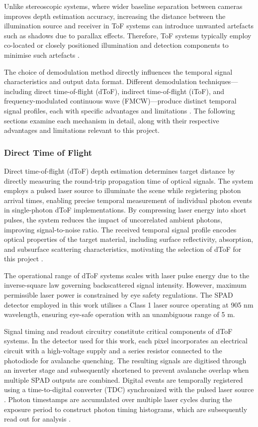 \documentclass[12pt,a4paper,oneside]{report}
\begin{document}
Unlike stereoscopic systems, where wider baseline separation between cameras improves depth estimation accuracy, increasing the distance between the illumination source and receiver in ToF systems can introduce unwanted artefacts such as shadows due to parallax effects. Therefore, ToF systems typically employ co-located or closely positioned illumination and detection components to minimise such artefacts \cite{bamji2022}.

The choice of demodulation method directly influences the temporal signal characteristics and output data format. Different demodulation techniques—including direct time-of-flight (dToF), indirect time-of-flight (iToF), and frequency-modulated continuous wave (FMCW)—produce distinct temporal signal profiles, each with specific advantages and limitations \cite{bamji2022}. The following sections examine each mechanism in detail, along with their respective advantages and limitations relevant to this project.

\subsubsection{Direct Time of Flight}
\label{subsubsec:direct_tof}

Direct time-of-flight (dToF) depth estimation determines target distance by directly measuring the round-trip propagation time of optical signals. The system employs a pulsed laser source to illuminate the scene while registering photon arrival times, enabling precise temporal measurement of individual photon events in single-photon dToF implementations. By compressing laser energy into short pulses, the system reduces the impact of uncorrelated ambient photons, improving signal-to-noise ratio. The received temporal signal profile encodes optical properties of the target material, including surface reflectivity, absorption, and subsurface scattering characteristics, motivating the selection of dToF for this project \cite{su2016,becker2023}.

The operational range of dToF systems scales with laser pulse energy due to the inverse-square law governing backscattered signal intensity. However, maximum permissible laser power is constrained by eye safety regulations. The SPAD detector employed in this work utilises a Class 1 laser source operating at 905 nm wavelength, ensuring eye-safe operation with an unambiguous range of 5 m.

Signal timing and readout circuitry constitute critical components of dToF systems. In the detector used for this work, each pixel incorporates an electrical circuit with a high-voltage supply and a series resistor connected to the photodiode for avalanche quenching. The resulting signals are digitised through an inverter stage and subsequently shortened to prevent avalanche overlap when multiple SPAD outputs are combined. Digital events are temporally registered using a time-to-digital converter (TDC) synchronized with the pulsed laser source \cite{sesta2023,nissinen2009,richardson2009}. Photon timestamps are accumulated over multiple laser cycles during the exposure period to construct photon timing histograms, which are subsequently read out for analysis \cite{piron2020}.
\end{document}

